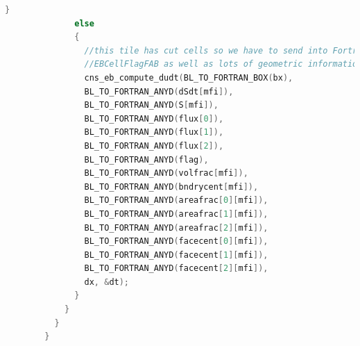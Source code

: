 \begin{lstlisting}[language=cpp]
              }
              else
              {
                //this tile has cut cells so we have to send into Fortran
                //EBCellFlagFAB as well as lots of geometric information
                cns_eb_compute_dudt(BL_TO_FORTRAN_BOX(bx),
                BL_TO_FORTRAN_ANYD(dSdt[mfi]),
                BL_TO_FORTRAN_ANYD(S[mfi]),
                BL_TO_FORTRAN_ANYD(flux[0]),
                BL_TO_FORTRAN_ANYD(flux[1]),
                BL_TO_FORTRAN_ANYD(flux[2]),
                BL_TO_FORTRAN_ANYD(flag),
                BL_TO_FORTRAN_ANYD(volfrac[mfi]),
                BL_TO_FORTRAN_ANYD(bndrycent[mfi]),
                BL_TO_FORTRAN_ANYD(areafrac[0][mfi]),
                BL_TO_FORTRAN_ANYD(areafrac[1][mfi]),
                BL_TO_FORTRAN_ANYD(areafrac[2][mfi]),
                BL_TO_FORTRAN_ANYD(facecent[0][mfi]),
                BL_TO_FORTRAN_ANYD(facecent[1][mfi]),
                BL_TO_FORTRAN_ANYD(facecent[2][mfi]),
                dx, &dt);
              }
            }
          }
        }

\end{lstlisting}
